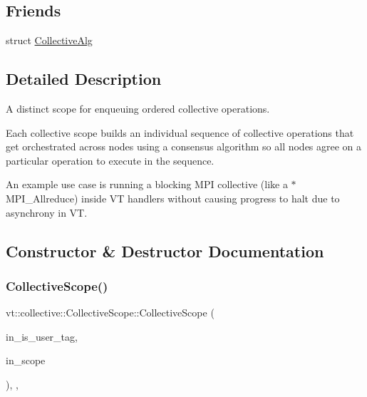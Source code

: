 \subsection*{Friends}
\begin{DoxyCompactItemize}
\item 
struct \hyperlink{structvt_1_1collective_1_1_collective_scope_aa2494f91f09e2ba6a5baae9ee9de430e}{Collective\+Alg}
\end{DoxyCompactItemize}


\subsection{Detailed Description}
A distinct scope for enqueuing ordered collective operations. 

Each collective scope builds an individual sequence of collective operations that get orchestrated across nodes using a consensus algorithm so all nodes agree on a particular operation to execute in the sequence.

An example use case is running a blocking M\+PI collective (like a {\ttfamily $\ast$} M\+P\+I\+\_\+\+Allreduce) inside VT handlers without causing progress to halt due to asynchrony in VT. 

\subsection{Constructor \& Destructor Documentation}
\mbox{\label{structvt_1_1collective_1_1_collective_scope_a2b51fd570c218fc089caaded29fd17c9}} 
\subsubsection{\texorpdfstring{Collective\+Scope()}{CollectiveScope()}\hspace{0.1cm}{\footnotesize\ttfamily [1/3]}}
{\footnotesize\ttfamily vt\+::collective\+::\+Collective\+Scope\+::\+Collective\+Scope (\begin{DoxyParamCaption}\item[{bool}]{in\+\_\+is\+\_\+user\+\_\+tag,  }\item[{\hyperlink{namespacevt_a84ab281dae04a52a4b243d6bf62d0e52}{Tag\+Type}}]{in\+\_\+scope }\end{DoxyParamCaption})\hspace{0.3cm}{\ttfamily [inline]}, {\ttfamily [explicit]}, {\ttfamily [private]}}



